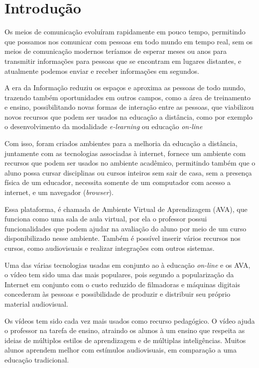 \chapter{Introdução}
Os meios de comunicação evoluíram rapidamente em pouco tempo, permitindo que possamos nos comunicar com pessoas em todo mundo em tempo real, sem os meios de comunicação modernos teríamos de esperar meses ou anos para transmitir informações para pessoas que se encontram em lugares distantes, e atualmente podemos enviar e receber informações em segundos.
\par
A era da Informação reduziu os espaços e aproxima as pessoas de todo mundo, trazendo também oportunidades em outros campos, como a área de treinamento e ensino, possibilitando novas formas de interação entre as pessoas, que viabilizou novos recursos que podem ser usados na educação a distância, como por exemplo o desenvolvimento da modalidade \textit{e-learning} ou educação \textit{on-line}
\par
Com isso, foram criados ambientes para a melhoria da educação a distância, juntamente com as tecnologias associadas à internet, fornece um ambiente com recursos que podem ser usados no ambiente acadêmico, permitindo também que o aluno possa cursar disciplinas ou cursos inteiros sem sair de casa, sem a presença física de um educador, necessita somente de um computador com acesso a internet, e um navegador (\textit{browser}).
\par
Essa plataforma, é chamada de Ambiente Virtual de Aprendizagem (AVA), que funciona como uma sala de aula virtual, por ela o professor possui funcionalidades que podem ajudar na avaliação do aluno por meio de um curso disponibilizado nesse ambiente. Também é possível inserir vários recursos nos cursos, como audiovisuais e realizar integrações com outros sistemas.
\par
Uma das várias tecnologias usadas em conjunto ao à educação \textit{on-line} e os AVA, o vídeo tem sido uma das mais populares, pois segundo  a popularização da Internet em conjunto com o custo reduzido de filmadoras e máquinas digitais concederam às pessoas e possibilidade de produzir e distribuir seu próprio material audiovisual.
\par
Os vídeos tem sido cada vez mais usados como recurso pedagógico. O vídeo ajuda o professor na tarefa de ensino, atraindo os alunos à um ensino que respeita as ideias de múltiplos estilos de aprendizagem e de múltiplas inteligências. Muitos alunos aprendem melhor com estímulos audiovisuais, em comparação a uma educação tradicional.
